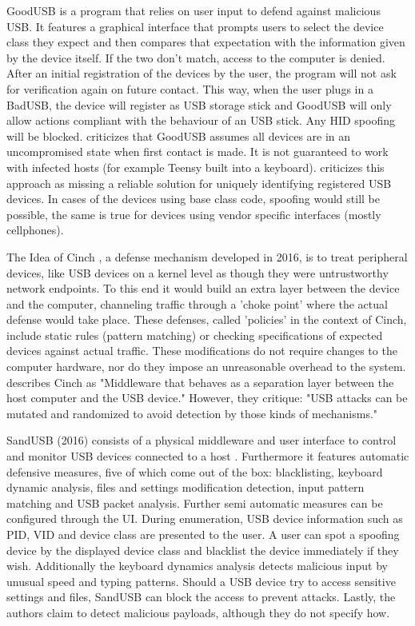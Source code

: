 GoodUSB \cite{tianDefendingMaliciousUSB2015} is a program that relies on user input to defend against malicious USB. It features a graphical interface that prompts users to select the device class they expect and then compares that expectation with the information given by the device itself. If the two don't match, access to the computer is denied. After an initial registration of the devices by the user, the program will not ask for verification again on future contact. This way, when the user plugs in a BadUSB, the device will register as USB storage stick and GoodUSB will only allow actions compliant with the behaviour of an USB stick. Any HID spoofing will be blocked.
\cite{nissimUSBbasedAttacks2017} criticizes that GoodUSB assumes all devices are in an uncompromised state when first contact is made. It is not guaranteed to work with infected hosts (for example Teensy built into a keyboard). 
\cite{mohammadmoradiMakingWhitelistingBasedDefense2018} criticizes this approach as missing a reliable solution for uniquely identifying registered USB devices. In cases of the devices using base class code, spoofing would still be possible, the same is true for devices using vendor specific interfaces (mostly cellphones). 

The Idea of Cinch \cite{angelDefendingMaliciousPeripherals2016}, a defense mechanism developed in 2016, is to treat peripheral devices, like USB devices on a kernel level as though they were untrustworthy network endpoints. To this end it would build an extra layer between the device and the computer, channeling traffic through a 'choke point' where the actual defense would take place. These defenses, called 'policies' in the context of Cinch, include static rules (pattern matching) or checking specifications of expected devices against actual traffic. 
These modifications do not require changes to the computer hardware, nor do they impose an unreasonable overhead to the system.
\cite{farhiMalboardNovelUser2019} describes Cinch as "Middleware that behaves as a separation layer between the host computer and the USB device." However, they critique: "USB attacks can be mutated and randomized to avoid detection by those kinds of mechanisms." \cite[p.~7]{farhiMalboardNovelUser2019}

SandUSB (2016) consists of a physical middleware and user interface to control and monitor USB devices connected to a host \cite{loeSandUSBInstallationfreeSandbox2016}. Furthermore it features automatic defensive measures, five of which come out of the box: blacklisting, keyboard dynamic analysis, files and settings modification detection, input pattern matching and USB packet analysis. Further semi automatic measures can be configured through the UI. 
During enumeration, USB device information such as PID, VID and device class are presented to the user. A user can spot a spoofing device by the displayed device class and blacklist the device immediately if they wish.
Additionally the keyboard dynamics analysis detects malicious input by unusual speed and typing patterns. Should a USB device try to access sensitive settings and files, SandUSB can block the access to prevent attacks. Lastly, the authors claim to detect malicious payloads, although they do not specify how. 


